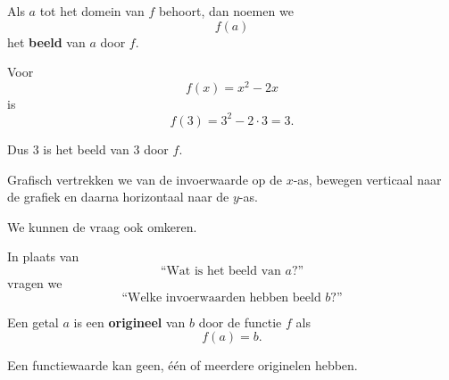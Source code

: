 \documentclass{ximera}
\begin{document}


\begin{definitie}
Als \(a\) tot het domein van \(f\) behoort, dan noemen we
\[
f(a)
\]
het \textbf{beeld} van \(a\) door \(f\).
\end{definitie}

\begin{voorbeeld}
Voor
\[
f(x)=x^2-2x
\]
is
\[
f(3)=3^2-2\cdot3=3.
\]

Dus \(3\) is het beeld van \(3\) door \(f\).
\end{voorbeeld}

Grafisch vertrekken we van de invoerwaarde op de \(x\)-as, bewegen verticaal
naar de grafiek en daarna horizontaal naar de \(y\)-as.

\begin{center}
\end{center}



We kunnen de vraag ook omkeren.

In plaats van
\[
\text{``Wat is het beeld van \(a\)?''}
\]
vragen we
\[
\text{``Welke invoerwaarden hebben beeld \(b\)?''}
\]

\begin{definitie}
Een getal \(a\) is een \textbf{origineel} van \(b\) door de functie \(f\)
als
\[
f(a)=b.
\]
\end{definitie}

Een functiewaarde kan geen, één of meerdere originelen hebben.
\end{document}
